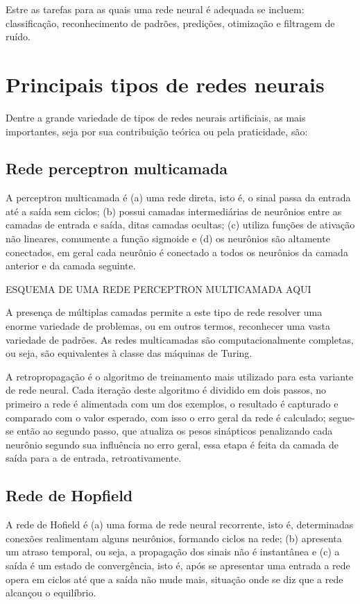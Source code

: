 Estre as tarefas para as quais uma rede neural é adequada se
incluem: classificação, reconhecimento de padrões, predições, otimização
e filtragem de ruído.

\section{Principais tipos de redes neurais}\label{sec:red_tip}

Dentre a grande variedade de tipos de redes neurais artificiais, as mais
importantes, seja por sua contribuição teórica ou pela praticidade, são:

\subsection{Rede perceptron multicamada}

A perceptron multicamada é (a) uma rede direta, isto é, o sinal passa da entrada
até a saída sem ciclos; (b) possui camadas intermediárias de neurônios entre as
camadas de entrada e saída, ditas camadas ocultas; (c) utiliza funções de
ativação não lineares, comumente a função sigmoide e (d) os neurônios são
altamente conectados, em geral cada neurônio é conectado a todos os neurônios
da camada anterior e da camada seguinte.

ESQUEMA DE UMA REDE PERCEPTRON MULTICAMADA AQUI

A presença de múltiplas camadas permite a este tipo de rede resolver uma enorme
variedade de problemas, ou em outros termos, reconhecer uma vasta variedade de
padrões. As redes multicamadas são computacionalmente completas, ou seja, são
equivalentes à classe das máquinas de Turing.

A retropropagação é o algoritmo de treinamento mais utilizado para esta variante
de rede neural. Cada iteração deste algoritmo é dividido em dois passos, no
primeiro a rede é alimentada com um dos exemplos, o resultado é capturado e
comparado com o valor esperado, com isso o erro geral da rede é calculado;
segue-se então ao segundo passo, que atualiza os pesos sinápticos penalizando
cada neurônio segundo sua influência no erro geral, essa etapa é feita da camada
de saída para a de entrada, retroativamente.

\subsection{Rede de Hopfield}

A rede de Hofield é (a) uma forma de rede neural recorrente, isto é,
determinadas conexões realimentam alguns neurônios, formando ciclos na rede; (b)
apresenta um atraso temporal, ou seja, a propagação dos sinais não é instantânea
e (c) a saída é um estado de convergência, isto é, após se apresentar uma entrada
a rede opera em ciclos até que a saída não mude mais, situação onde se diz que a
rede alcançou o equilíbrio.

